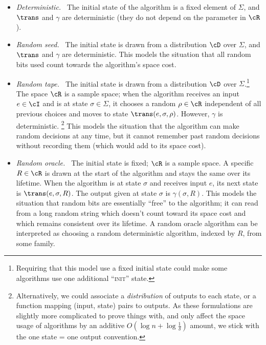 \iflipics\begin{itemize}\else
\begin{itemize}[left=2ex]\fi
  \item \emph{Deterministic.~} The initial state of the algorithm is a fixed
  element of $\Sigma$, and $\trans$ and $\gamma$ are deterministic (they do not
  depend on the parameter in $\cR$). 
  \item \emph{Random seed.~} The initial state is drawn from a distribution
  $\cD$ over $\Sigma$, and $\trans$ and $\gamma$ are deterministic. This models
  the situation that all random bits used count towards the algorithm's space
  cost.
  \item \emph{Random tape.~} The initial state is drawn from a distribution
  $\cD$ over $\Sigma$.\footnote{Requiring that this model use a fixed initial
  state could make some algorithms use one additional ``\textsc{init}''
  state.} The space $\cR$ is a sample space; when the algorithm receives an
  input $e \in \cI$ and is at state $\sigma \in \Sigma$, it chooses a random
  $\rho \in \cR$ independent of all previous choices and moves to state
  $\trans(e, \sigma, \rho)$. However, $\gamma$ is deterministic.%
  \footnote{Alternatively, we could associate a \emph{distribution} of outputs
  to each state, or a function mapping (input, state) pairs to outputs. As
  these formulations are slightly more complicated to prove things with, and
  only affect the space usage of \miflong algorithms by an additive $O(\log n
  + \log \frac{1}{\delta})$ amount, we stick with the one state = one output
  convention.} %
  This models the situation that the algorithm can make random decisions at
  any time, but it cannot remember past random decisions without recording
  them (which would add to its space cost). 
  \item \emph{Random oracle.~} The initial state is fixed; $\cR$ is a
  sample space. A specific $R \in \cR$ is drawn at the start of the algorithm
  and stays the same over its lifetime. When the algorithm is at state
  $\sigma$ and receives input $e$, its next state is $\trans(e, \sigma, R)$.
  The output given at state $\sigma$ is $\gamma(\sigma, R)$.  This models the
  situation that random bits are essentially ``free'' to the algorithm; it can
  read from a long random string which doesn't count toward its space cost and
  which remains consistent over its lifetime. A random oracle algorithm can be
  interpreted as choosing a random deterministic algorithm, indexed by $R$,
  from some family.  
\end{itemize}


\end{itemize}
